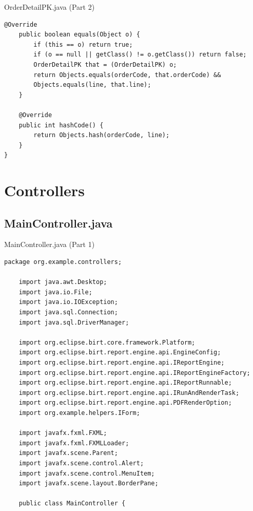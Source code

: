 \documentclass[aspectratio=169, table]{beamer}
\begin{document}
\begin{frame}[fragile]{OrderDetailPK.java (Part 2)}
\vspace{20pt}
\begin{lstlisting}[style=JavaStyle]
	@Override
	public boolean equals(Object o) {
		if (this == o) return true;
		if (o == null || getClass() != o.getClass()) return false;
		OrderDetailPK that = (OrderDetailPK) o;
		return Objects.equals(orderCode, that.orderCode) && 
		Objects.equals(line, that.line);
	}
	
	@Override
	public int hashCode() {
		return Objects.hash(orderCode, line);
	}
}
\end{lstlisting}
\end{frame}


\section{Controllers}
\subsection{MainController.java}
\begin{frame}[fragile]{MainController.java (Part 1)}
\vspace{20pt}
\begin{lstlisting}[style=JavaStyle]
	package org.example.controllers;
	
	import java.awt.Desktop;
	import java.io.File;
	import java.io.IOException;
	import java.sql.Connection;
	import java.sql.DriverManager;
	
	import org.eclipse.birt.core.framework.Platform;
	import org.eclipse.birt.report.engine.api.EngineConfig;
	import org.eclipse.birt.report.engine.api.IReportEngine;
	import org.eclipse.birt.report.engine.api.IReportEngineFactory;
	import org.eclipse.birt.report.engine.api.IReportRunnable;
	import org.eclipse.birt.report.engine.api.IRunAndRenderTask;
	import org.eclipse.birt.report.engine.api.PDFRenderOption;
	import org.example.helpers.IForm;
	
	import javafx.fxml.FXML;
	import javafx.fxml.FXMLLoader;
	import javafx.scene.Parent;
	import javafx.scene.control.Alert;
	import javafx.scene.control.MenuItem;
	import javafx.scene.layout.BorderPane;
	
	public class MainController {
	\end{lstlisting}
\end{frame}
\end{document}
